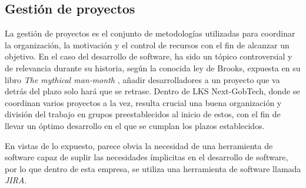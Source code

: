 \subsection{Gestión de proyectos}

La gestión de proyectos es el conjunto de metodologías utilizadas para coordinar la organización, la motivación y el control de recursos con el fin de alcanzar un objetivo. En el caso del desarrollo de software, ha sido un tópico controversial y de relevancia durante su historia, según la conocida ley de Brooks, expuesta en su libro \textit{The mythical man-month} \cite{Brooks1975}, añadir desarrolladores a un proyecto que va detrás del plazo solo hará que se retrase. Dentro de LKS Next-GobTech, donde se coordinan varios proyectos a la vez, resulta crucial una buena organización y división del trabajo en grupos preestablecidos al inicio de estos, con el fin de llevar un óptimo desarrollo en el que se cumplan los plazos establecidos. 

En vistas de lo expuesto, parece obvia la necesidad de una herramienta de software capaz de suplir las necesidades ímplicitas en el desarrollo de software, por lo que dentro de esta empresa, se utiliza una herramienta de software llamada \textit{JIRA}. 